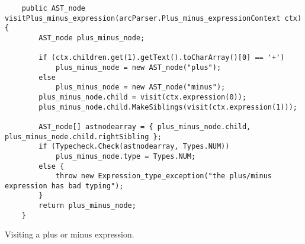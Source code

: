 \begin{listing}[htb!]
    \begin{verbatim}
    public AST_node visitPlus_minus_expression(arcParser.Plus_minus_expressionContext ctx) {
        AST_node plus_minus_node;

        if (ctx.children.get(1).getText().toCharArray()[0] == '+')
            plus_minus_node = new AST_node("plus");
        else
            plus_minus_node = new AST_node("minus");
        plus_minus_node.child = visit(ctx.expression(0));
        plus_minus_node.child.MakeSiblings(visit(ctx.expression(1)));

        AST_node[] astnodearray = { plus_minus_node.child, plus_minus_node.child.rightSibling };
        if (Typecheck.Check(astnodearray, Types.NUM))
            plus_minus_node.type = Types.NUM;
        else {
            throw new Expression_type_exception("the plus/minus expression has bad typing");
        }
        return plus_minus_node;
    }
    \end{verbatim}
    \caption{Visiting a plus or minus expression.}
    \label{lst:visitorplusminusexpression}
\end{listing}

        





